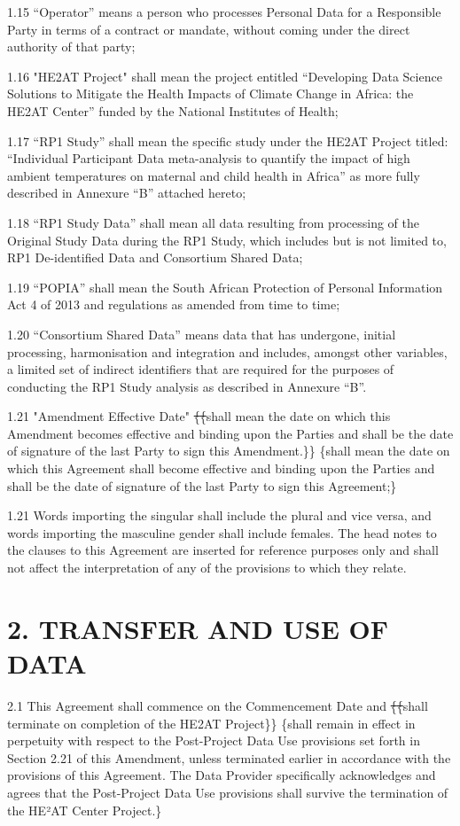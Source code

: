 \documentclass[12pt,letterpaper]{article}
\newcommand{\deleted}[1]{\textcolor{deletecolor}{\sout{#1}}}
\newcommand{\added}[1]{\textcolor{addcolor}{#1}}
\begin{document}
1.15	“Operator” means a person who processes Personal Data for a Responsible Party in terms of a contract or mandate, without coming under the direct authority of that party;

1.16	"HE2AT Project" shall mean the project entitled “Developing Data Science Solutions to Mitigate the Health Impacts of Climate Change in Africa: the HE2AT Center” funded by the National Institutes of Health;

1.17	“RP1 Study” shall mean the specific study under the HE2AT Project titled: “Individual Participant Data meta-analysis to quantify the impact of high ambient temperatures on maternal and child health in Africa” as more fully described in Annexure “B” attached hereto;

1.18	“RP1 Study Data” shall mean all data resulting from processing of the Original Study Data during the RP1 Study, which includes but is not limited to, RP1 De-identified Data and Consortium Shared Data;

1.19	“POPIA” shall mean the South African Protection of Personal Information Act 4 of 2013 and regulations as amended from time to time;

1.20	“Consortium Shared Data” means data that has undergone, initial processing, harmonisation and integration and includes, amongst other variables, a limited set of indirect identifiers that are required for the purposes of conducting the RP1 Study analysis as described in Annexure “B”.

1.21	"Amendment Effective Date" \deleted\{\deleted\{shall mean the date on which this Amendment becomes effective and binding upon the Parties and shall be the date of signature of the last Party to sign this Amendment.\}\} \added\{shall mean the date on which this Agreement shall become effective and binding upon the Parties and shall be the date of signature of the last Party to sign this Agreement;\}

1.21	Words importing the singular shall include the plural and vice versa, and words importing the masculine gender shall include females. The head notes to the clauses to this Agreement are inserted for reference purposes only and shall not affect the interpretation of any of the provisions to which they relate.

\section*{2.	TRANSFER AND USE OF DATA}

2.1	This Agreement shall commence on the Commencement Date and \deleted\{\deleted\{shall terminate on completion of the HE2AT Project\}\} \added\{shall remain in effect in perpetuity with respect to the Post-Project Data Use provisions set forth in Section 2.21 of this Amendment, unless terminated earlier in accordance with the provisions of this Agreement. The Data Provider specifically acknowledges and agrees that the Post-Project Data Use provisions shall survive the termination of the HE²AT Center Project.\}
\end{document}
